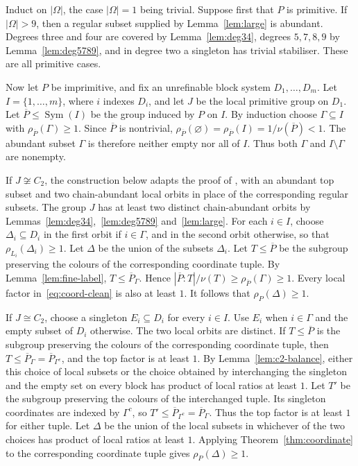 \documentclass[10pt]{amsart}
\theoremstyle{definition}
\renewcommand{\ge}{\geqslant}
\renewcommand{\leq}{\leqslant}
\renewcommand{\geq}{\geqslant}
\let\oldendproof\endproof
\renewenvironment{proof}[1][\proofname]{%
  \oldproof[\bfseries #1]%
}{\oldendproof}
\DeclareMathOperator{\Sym}{Sym}
\numberwithin{equation}{section}
\numberwithin{table}{section}
\begin{document}
\begin{proof}[Proof of Theorem~\textup{\ref{thm:top-hni}}]
Induct on $|\Omega|$, the case $|\Omega|=1$ being trivial. Suppose first that $P$
is primitive. If $|\Omega|>9$, then a regular subset supplied by
Lemma~\ref{lem:large} is abundant. Degrees three and four are covered by Lemma~\ref{lem:deg34}, degrees
$5,7,8,9$ by Lemma~\ref{lem:deg5789}, and in degree two a singleton has trivial
stabiliser. These are all primitive cases.

Now let $P$ be imprimitive, and fix an unrefinable block system
$D_1,\ldots,D_m$. Let $I=\{1,\ldots,m\}$, where $i$ indexes $D_i$, and let
$J$ be the local primitive group on $D_1$. Let $\overline P\leq\Sym(I)$ be
the group induced by $P$ on $I$. By induction choose
$\Gamma\subseteq I$ with
$\rho_{\overline{P}}(\Gamma)\ge1$. Since $\overline{P}$ is nontrivial,
$\rho_{\overline{P}}(\varnothing)=\rho_{\overline{P}}(I)=1/\nu(\overline{P})<1$.
The abundant subset $\Gamma$ is therefore neither empty nor all of $I$. Thus
both $\Gamma$ and $I\setminus\Gamma$ are nonempty.

If $J\not\cong C_2$, the construction below adapts the proof of
\cite[Theorem~2]{Glu83}, with an abundant top subset and two
chain-abundant local orbits in place of the corresponding regular subsets.
The group $J$ has at least two distinct chain-abundant orbits by
Lemmas~\ref{lem:deg34},~\ref{lem:deg5789} and~\ref{lem:large}. For each
$i\in I$, choose $\Delta_i\subseteq D_i$ in the first orbit if
$i\in\Gamma$, and in the second orbit otherwise, so that
$\rho_{L_i}(\Delta_i)\geq1$. Let $\Delta$ be the union of the subsets
$\Delta_i$. Let $T\leq\overline P$ be
the subgroup preserving the colours of the corresponding coordinate tuple.
By Lemma~\ref{lem:fine-label}, $T\leq\overline{P}_\Gamma$. Hence
$|\overline{P}:T|/\nu(T)\ge\rho_{\overline{P}}(\Gamma)\ge1$. Every local
factor in~\eqref{eq:coord-clean} is also at least $1$. It follows that
$\rho_P(\Delta)\ge1$.

If $J\cong C_2$, choose a singleton $E_i\subseteq D_i$ for every $i\in I$.
Use $E_i$ when $i\in\Gamma$ and the empty subset of $D_i$ otherwise. The two
local orbits are distinct. If $T\leq\overline P$ is the subgroup preserving
the colours of the corresponding coordinate tuple, then
$T\leq\overline{P}_\Gamma=\overline{P}_{\Gamma^c}$, and the top factor is at
least $1$. By Lemma~\ref{lem:c2-balance}, either this choice of local subsets
or the choice obtained by interchanging the singleton and the empty set on
every block has product of local ratios at least $1$. Let $T'$ be the subgroup
preserving the colours of the interchanged tuple. Its singleton coordinates
are indexed by $\Gamma^c$, so
$T'\leq\overline P_{\Gamma^c}=\overline P_\Gamma$. Thus the top factor is at
least $1$ for either tuple. Let $\Delta$ be the union of the local subsets in
whichever of the two choices has product of local ratios at least $1$.
Applying Theorem~\ref{thm:coordinate} to the corresponding coordinate tuple
gives $\rho_P(\Delta)\ge1$.
\end{proof}
\end{document}
